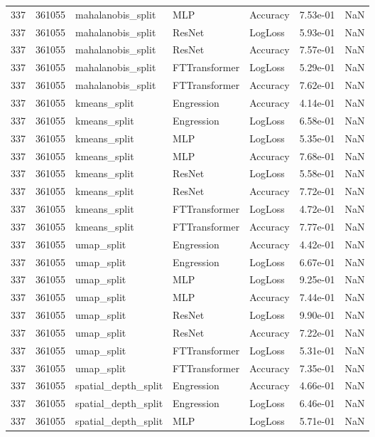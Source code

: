 \begin{tabular}{rrlllrr}
337 & 361055 & mahalanobis\_split & MLP & Accuracy & 7.53e-01 & NaN \\
337 & 361055 & mahalanobis\_split & ResNet & LogLoss & 5.93e-01 & NaN \\
337 & 361055 & mahalanobis\_split & ResNet & Accuracy & 7.57e-01 & NaN \\
337 & 361055 & mahalanobis\_split & FTTransformer & LogLoss & 5.29e-01 & NaN \\
337 & 361055 & mahalanobis\_split & FTTransformer & Accuracy & 7.62e-01 & NaN \\
337 & 361055 & kmeans\_split & Engression & Accuracy & 4.14e-01 & NaN \\
337 & 361055 & kmeans\_split & Engression & LogLoss & 6.58e-01 & NaN \\
337 & 361055 & kmeans\_split & MLP & LogLoss & 5.35e-01 & NaN \\
337 & 361055 & kmeans\_split & MLP & Accuracy & 7.68e-01 & NaN \\
337 & 361055 & kmeans\_split & ResNet & LogLoss & 5.58e-01 & NaN \\
337 & 361055 & kmeans\_split & ResNet & Accuracy & 7.72e-01 & NaN \\
337 & 361055 & kmeans\_split & FTTransformer & LogLoss & 4.72e-01 & NaN \\
337 & 361055 & kmeans\_split & FTTransformer & Accuracy & 7.77e-01 & NaN \\
337 & 361055 & umap\_split & Engression & Accuracy & 4.42e-01 & NaN \\
337 & 361055 & umap\_split & Engression & LogLoss & 6.67e-01 & NaN \\
337 & 361055 & umap\_split & MLP & LogLoss & 9.25e-01 & NaN \\
337 & 361055 & umap\_split & MLP & Accuracy & 7.44e-01 & NaN \\
337 & 361055 & umap\_split & ResNet & LogLoss & 9.90e-01 & NaN \\
337 & 361055 & umap\_split & ResNet & Accuracy & 7.22e-01 & NaN \\
337 & 361055 & umap\_split & FTTransformer & LogLoss & 5.31e-01 & NaN \\
337 & 361055 & umap\_split & FTTransformer & Accuracy & 7.35e-01 & NaN \\
337 & 361055 & spatial\_depth\_split & Engression & Accuracy & 4.66e-01 & NaN \\
337 & 361055 & spatial\_depth\_split & Engression & LogLoss & 6.46e-01 & NaN \\
337 & 361055 & spatial\_depth\_split & MLP & LogLoss & 5.71e-01 & NaN \\

\end{tabular}
